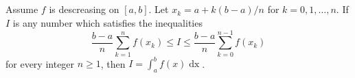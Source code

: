 \documentclass{report}
\begin{document}
\subsection{}%
\label{sub:theorem-1.14}

\begin{theorem}[1.14]

  Assume $f$ is descreasing on $[a, b]$.
  Let $x_k = a + k(b - a) / n$ for $k = 0, 1, \ldots, n$.
  If $I$ is any number which satisfies the inequalities
    \begin{equation}
      \label{sub:theorem-1.14-eq1}
      \frac{b - a}{n} \sum_{k=1}^n f(x_k)
        \leq I \leq
        \frac{b - a}{n} \sum_{k=0}^{n-1} f(x_k)
    \end{equation}
    for every integer $n \geq 1$, then $I = \int_a^b f(x) \mathop{dx}$.

\end{theorem}
\end{document}
